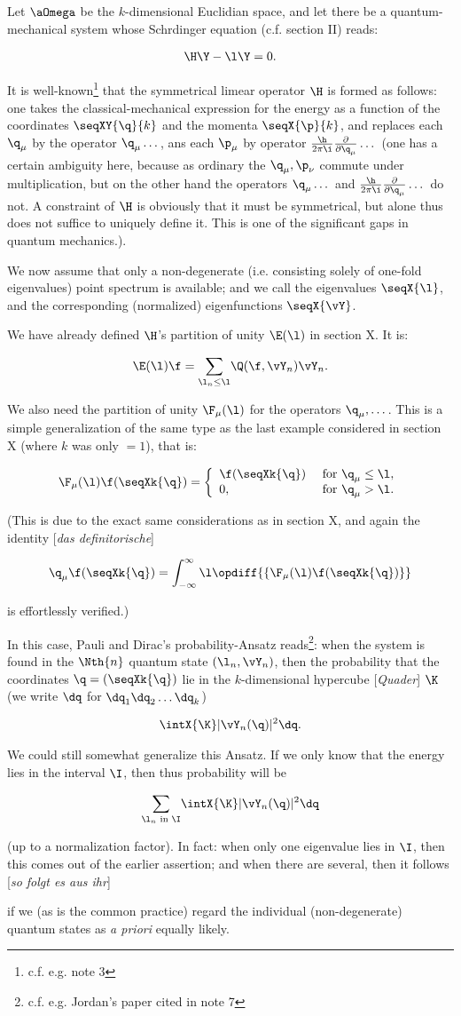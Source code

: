 \documentclass{article}
\newcommand{\WTF}[1]{
[\it{\small{#1}}]
}
\newcommand{\uequ}[1]{
\begin{align*}
#1
\end{align*}
}
\newcommand{\oppddX}[1]{
\frac{\partial}{\partial{#1}}
}
\renewcommand{\it}[1]{\textit{#1}}
\newcommand{\sumX}[1]{\underset{#1}{\sum}}
\newcommand{\intXY}[2]{\int_{#1}^{#2}}
\begin{document}
Let $\aOmega$ be the $k$-dimensional Euclidian space, and let there be a quantum-mechanical system whose Schrdinger equation (c.f. section II) reads:
\uequ{
\H\Y - \l\Y = 0.
}
It is well-known\footnote{c.f. e.g. note 3} that the symmetrical limear operator $\H$ is formed as follows: one takes the classical-mechanical expression for the energy as a function of the coordinates $\seqXY{\q}{k}$ and the momenta $\seqX{\p}{k}$, and replaces each $\q_\mu$ by the operator $\q_\mu\dots$, ans each $\p_\mu$ by operator $\frac{\h}{2\pi\i}\oppddX{\q_\mu}\dots$ (one has a certain ambiguity here, because as ordinary the $\q_\mu,\p_\nu$ commute under multiplication, but on the other hand the operators $\q_\mu\dots$ and $\frac{\h}{2\pi\i}\oppddX{\q_\mu}\dots$ do not. A constraint of $\H$ is obviously that it must be symmetrical, but alone thus does not suffice to uniquely define it. This is one of the significant gaps in quantum mechanics.).

We now assume that only a non-degenerate (i.e. consisting solely of one-fold eigenvalues) point spectrum is available; and we call the eigenvalues $\seqX{\l}$, and the corresponding (normalized) eigenfunctions $\seqX{\vY}$.

We have already defined $\H$'s partition of unity $\E(\l)$ in section X. It is:
\uequ{
\E(\l)\f = \sumX{\l_n\leq \l}\Q(\f,\vY_n)\vY_n.
}

We also need the partition of unity $\F_\mu(\l)$ for the operators $\q_\mu,\dots$. This is a simple generalization of the same type as the last example considered in section X (where $k$ was only $=1$), that is:
\uequ{
\F_\mu(\l)\f(\seqXk{\q}) = \left\{
     \begin{array}{lr}
       \f(\seqXk{\q}) & \text{ for } \q_\mu \leq \l, \\
       0, & \text{ for } \q_\mu > \l.
     \end{array}
   \right.
}
(This is due to the exact same considerations as in section X, and again the identity\WTF{das definitorische}
\uequ{
\q_\mu\f(\seqXk{\q}) = \intXY{-\infty}{\infty}\l\opdiff{\lbrace\F_\mu(\l)\f(\seqXk{\q})\rbrace}
}
is effortlessly verified.)

In this case, Pauli and Dirac's probability-Ansatz reads\footnote{c.f. e.g. Jordan's paper cited in note 7}: when the system is found in the $\Nth{n}$ quantum state $(\l_n,\vY_n)$, then the probability that the coordinates $\q = (\seqXk{\q})$ lie in the $k$-dimensional hypercube\WTF{Quader} $\K$ (we write $\dq$ for $\dq_1\dq_2\dots\dq_k$)
\uequ{
\intX{\K}|\vY_n(\q)|^2\dq.
}
We could still somewhat generalize this Ansatz. If we only know that the energy lies in the interval $\I$, then thus probability will be 
\uequ{
\sumX{\l_n \text{ in } \I}\intX{\K}|\vY_n(\q)|^2\dq
}
(up to a normalization factor). In fact: when only one eigenvalue lies in $\I$, then this comes out of the earlier assertion; and when there are several, then it follows\WTF{so folgt es aus ihr}
 if we (as is the common practice) regard the individual (non-degenerate) quantum states as \it{a priori} equally likely.
  
\end{document}
